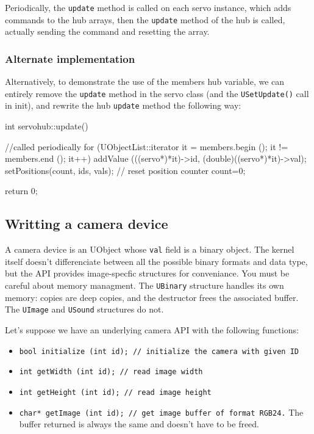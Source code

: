 Periodically, the \lstinline{update} method is called on each servo
instance, which adds commands to the hub arrays, then the
\lstinline{update} method of the hub is called, actually sending the
command and resetting the array.

\subsubsection{Alternate implementation}

Alternatively, to demonstrate the use of the members hub variable, we
can entirely remove the \lstinline{update} method in the servo class
(and the \lstinline{USetUpdate()} call in init), and rewrite the hub
\lstinline{update} method the following way:

\begin{cxx}
int servohub::update()
{
  //called periodically
  for (UObjectList::iterator it = members.begin ();
       it != members.end ();
       it++)
  {
    addValue (((servo*)*it)->id,
              (double)((servo*)*it)->val);
  }
  setPositions(count, ids, vals);
  // reset position counter
  count=0;

  return 0;
}
\end{cxx}

\subsection{Writting a camera device}

A camera device is an UObject whose \lstinline{val} field is a binary
object. The \urbi kernel itself doesn't differenciate between all the
possible binary formats and data type, but the API provides
image-specfic structures for conveniance. You must be careful about
memory managment. The \lstinline{UBinary} structure handles its own
memory: copies are deep copies, and the destructor frees the
associated buffer. The \lstinline{UImage} and \lstinline{USound}
structures do not.

Let's suppose we have an underlying camera API with the following functions:

\begin{itemize}
\item{\lstinline{bool initialize (int id); // initialize the camera with given ID}}
\item{\lstinline{int getWidth (int id); // read image width}}
\item{\lstinline{int getHeight (int id); // read image height}}
\item{\lstinline{char* getImage (int id); // get image buffer of format RGB24.}
  The buffer returned is always the same and doesn't have to be freed.}
\end{itemize}

